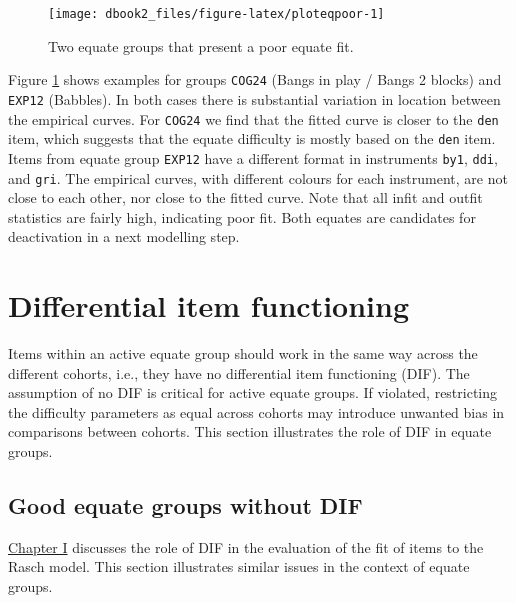 \documentclass[
]{book}
\begin{document}
\begin{figure}

{\centering \texttt{[image: dbook2\_files/figure-latex/ploteqpoor-1]} 

}

\caption{Two equate groups that present a poor equate fit.}\label{fig:ploteqpoor}
\end{figure}



Figure \ref{fig:ploteqpoor} shows examples for groups \texttt{COG24} (Bangs in play / Bangs 2 blocks) and \texttt{EXP12} (Babbles). In both cases there is substantial variation in location between the empirical curves. For \texttt{COG24} we find that the fitted curve is closer to the \texttt{den} item, which suggests that the equate difficulty is mostly based on the \texttt{den} item. Items from equate group \texttt{EXP12} have a different format in instruments \texttt{by1}, \texttt{ddi}, and \texttt{gri}. The empirical curves, with different colours for each instrument, are not close to each other, nor close to the fitted curve. Note that all infit and outfit statistics are fairly high, indicating poor fit. Both equates are candidates for deactivation in a next modelling step.

\hypertarget{sec:equatedif}{%
\section{Differential item functioning}\label{sec:equatedif}}

Items within an active equate group should work in the same way across the different cohorts, i.e., they have no differential item functioning (DIF). The assumption of no DIF is critical for active equate groups. If violated, restricting the difficulty parameters as equal across cohorts may introduce unwanted bias in comparisons between cohorts. This section illustrates the role of DIF in equate groups.

\hypertarget{good-equate-groups-without-dif}{%
\subsection{Good equate groups without DIF}\label{good-equate-groups-without-dif}}

\href{https://d-score.org/dbook1/sec-dif.html}{Chapter I} discusses the role of DIF in the evaluation of the fit of items to the Rasch model. This section illustrates similar issues in the context of equate groups.
\end{document}
